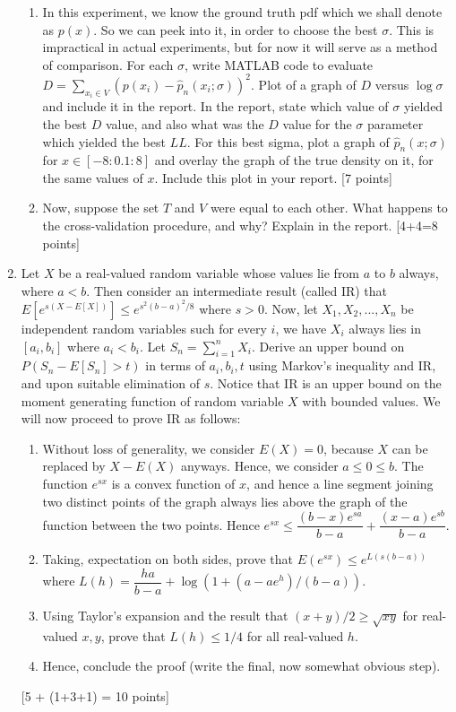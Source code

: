 \documentclass[11pt]{article}
\begin{document}
\begin{enumerate}
\begin{enumerate}
\item In this experiment, we know the ground truth pdf which we shall denote as $p(x)$.  So we can peek into it, in order to choose the best $\sigma$. This is impractical in actual experiments, but for now it will serve as a method of comparison. For each $\sigma$, write MATLAB code to evaluate $D = \sum_{x_i \in V} (p(x_i)-\hat{p}_n(x_i;\sigma))^2$. Plot of a graph of $D$ versus $\log \sigma$ and include it in the report. In the report, state which value of $\sigma$ yielded the best $D$ value, and also what was the $D$ value for the $\sigma$ parameter which yielded the best $LL$. For this best sigma, plot a graph of $\hat{p}_n(x;\sigma)$ for $x \in [-8:0.1:8]$ and overlay the graph of the true density on it, for the same values of $x$. Include this plot in your report. \textsf{[7 points]}
\item Now, suppose the set $T$ and $V$ were equal to each other. What happens to the cross-validation procedure, and why? Explain in the report. \textsf{[4+4=8 points]}
\end{enumerate}

\item Let $X$ be a real-valued random variable whose values lie from $a$ to $b$ always, where $a < b$. Then consider an intermediate result (called \textsf{IR}) that $E[e^{s(X-E[X])}] \leq e^{s^2(b-a)^2/8}$ where $s > 0$. Now, let $X_1, X_2,...,X_n$ be independent random variables such for every $i$, we have $X_i$ always lies in $[a_i, b_i]$ where $a_i < b_i$. Let $S_n = \sum_{i=1}^n X_i$. Derive an upper bound on $P(S_n - E[S_n] > t)$ in terms of $a_i, b_i, t$ using Markov's inequality and \textsf{IR}, and upon suitable elimination of $s$. Notice that  \textsf{IR} is an upper bound on the moment generating function of random variable $X$ with bounded values. We will now proceed to prove \textsf{IR} as follows:
\begin{enumerate}
\item Without loss of generality, we consider $E(X) = 0$, because $X$ can be replaced by $X-E(X)$ anyways. Hence, we consider $a \leq 0 \leq b$. The function $e^{sx}$ is a convex function of $x$, and hence a line segment joining two distinct points of the graph always lies above the graph of the function between the two points. Hence $e^{sx} \leq \dfrac{(b-x)e^{sa}}{b-a} + \dfrac{(x-a)e^{sb}}{b-a}$. 
\item Taking, expectation on both sides, prove that $E(e^{sx}) \leq e^{L(s(b-a))}$ where $L(h) = \dfrac{ha}{b-a} + \log(1 + (a-ae^h)/(b-a))$. 
\item Using Taylor's expansion and the result that $(x+y)/2 \geq \sqrt{xy}$ for real-valued $x,y$, prove that $L(h) \leq 1/4$ for all real-valued $h$.
\item Hence, conclude the proof (write the final, now somewhat obvious step).  
\end{enumerate} \textsf{[5 + (1+3+1) = 10 points]}

\end{enumerate}
\end{document}
